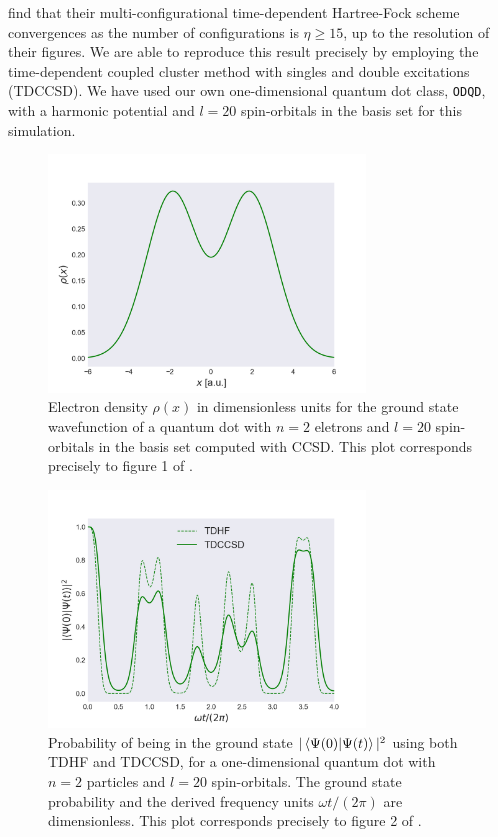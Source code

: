 \citeauthor{Zanghellini04} \cite{Zanghellini04} find that their multi-configurational time-dependent
Hartree-Fock scheme convergences as the number of configurations is 
$\eta \geq15$, up to the resolution of their figures.
We are able to reproduce this result precisely by employing the 
time-dependent coupled cluster method with singles and double excitations (TDCCSD).
We have used our own one-dimensional quantum dot class, \lstinline{ODQD}, with 
a harmonic potential and $l=20$ spin-orbitals
in the basis set for this simulation.

\begin{figure}
    \centering
    \includegraphics[width=0.75\textwidth]{results/figures/zanghellini_fig1.png}
    \caption{
        \label{fig:zanghellini_fig1}
        Electron density $\rho(x)$ in dimensionless units for the ground state wavefunction of
        a quantum dot with 
        $n=2$ eletrons and $l=20$ spin-orbitals in the basis set computed with
        CCSD. This plot 
        corresponds precisely to figure 1 of
        \citeauthor{Zanghellini04} \cite{Zanghellini04}.
    }
\end{figure}

\begin{figure}
    \centering
    \includegraphics[width=0.75\textwidth]{results/figures/zanghellini_fig2.png}
    \caption{
        \label{fig:zanghellini_fig2}
        Probability of being in the ground state $|\braket{\Psi(0)}{\Psi(t)}|^2$
        using both TDHF and TDCCSD, for a one-dimensional quantum dot with $n=2$
        particles and $l=20$ spin-orbitals. The ground state probability
        and the derived frequency units $\omega t/(2\pi)$ are dimensionless.
        This plot corresponds precisely to 
        figure 2 of \citeauthor{Zanghellini04} \cite{Zanghellini04}.
    }           
\end{figure}

